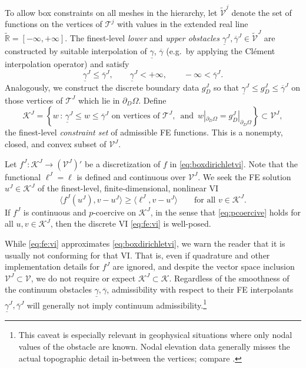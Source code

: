 \documentclass[letterpaper,final,12pt,reqno]{amsart}
\theoremstyle{cstyle}
\theoremstyle{cstyle*}
\theoremstyle{dstyle}
\numberwithin{equation}{section}
\numberwithin{figure}{section}
\numberwithin{table}{section}
\numberwithin{theorem}{section}
\newcommand{\RR}{\mathbb{R}}
\newcommand{\cK}{\mathcal{K}}
\newcommand{\ip}[2]{\langle#1,#2\rangle}
\begin{document}
To allow box constraints on all meshes in the hierarchy, let $\tilde{\mathcal{V}}^j$ denote the set of functions on the vertices of $\mathcal{T}^j$ with values in the extended real line $\tilde{\RR} = [-\infty,+\infty]$.  The finest-level \emph{lower} and \emph{upper obstacles} $\underline{\gamma}^J, \overline{\gamma}^J \in \tilde{\mathcal{V}}^J$ are constructed by suitable interpolation of $\underline{\gamma}$, $\overline{\gamma}$ (e.g.~by applying the Cl\'ement interpolation operator) and satisfy
\begin{equation}
\underline{\gamma}^J \le \overline{\gamma}^J, \qquad \underline{\gamma}^J < +\infty, \qquad -\infty < \overline{\gamma}^J. \label{eq:fe:boxconstraintrequirements}
\end{equation}
Analogously, we construct the discrete boundary data $g_D^J$ so that $\underline{\gamma}^J \le g_D^J \le \overline{\gamma}^J$ on those vertices of $\mathcal{T}^J$ which lie in $\partial_D \Omega$.  Define
\begin{equation}
\mathcal{K}^J = \left\{w\,:\,\underline{\gamma}^J \le w \le \overline{\gamma}^J \text{ on vertices of } \mathcal{T}^J, \, \text{ and } \, w|_{\partial_D\Omega} = g_D^J|_{\partial_D\Omega}\right\} \subset \mathcal{V}^J, \label{eq:fe:fineconstraintset}
\end{equation}
the finest-level \emph{constraint set} of admissible FE functions. This is a nonempty, closed, and convex subset of $\mathcal{V}^J$.

Let $f^J:\mathcal{K}^J \to (\mathcal{V}^J)'$ be a discretization of $f$ in \eqref{eq:boxdirichletvi}.  Note that the functional $\ell^J=\ell$ is defined and continuous over $\mathcal{V}^J$.  We seek the FE solution $u^J \in \mathcal{K}^J$ of the finest-level, finite-dimensional, nonlinear VI
\begin{equation}
\ip{f^J(u^J)}{v-u^J} \ge \ip{\ell^J}{v-u^J} \qquad \text{for all } v\in \cK^J. \label{eq:fe:vi}
\end{equation}
If $f^J$ is continuous and $p$-coercive on $\mathcal{K}^J$, in the sense that \eqref{eq:pcoercive} holds for all $u,v \in \mathcal{K}^J$, then the discrete VI \eqref{eq:fe:vi} is well-posed.

While \eqref{eq:fe:vi} approximates \eqref{eq:boxdirichletvi}, we warn the reader that it is usually not conforming for that VI.  That is, even if quadrature and other implementation details for $f^J$ are ignored, and despite the vector space inclusion $\mathcal{V}^J \subset \mathcal{V}$, we do not require or expect $\mathcal{K}^J \subset \mathcal{K}$.  Regardless of the smoothness of the continuum obstacles $\underline{\gamma}, \overline{\gamma}$, admissibility with respect to their FE interpolants $\underline{\gamma}^J, \overline{\gamma}^J$ will generally not imply continuum admissibility.\footnote{This caveat is especially relevant in geophysical situations where only nodal values of the obstacle are known.  Nodal elevation data generally misses the actual topographic detail in-between the vertices; compare \cite{Bueler2016}.}
\end{document}
